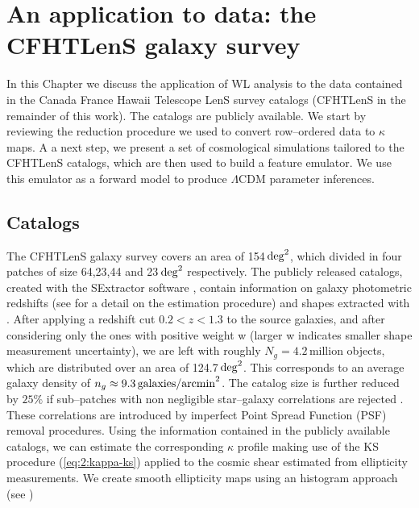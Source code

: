 
\chapter{An application to data: the CFHTLenS galaxy survey}
 \thispagestyle{plain}
\setlength{\parindent}{10mm}

\label{chp:6}

In this Chapter we discuss the application of WL analysis to the data contained in the Canada France Hawaii Telescope LenS survey catalogs \citep{cfht1,cfht2,CFHTKilbinger} (CFHTLenS in the remainder of this work). The catalogs are publicly available. We start by reviewing the reduction procedure we used to convert row--ordered data to $\kappa$ maps. A a next step, we present a set of cosmological simulations tailored to the CFHTLenS catalogs, which are then used to build a feature emulator. We use this emulator as a forward model to produce $\Lambda$CDM parameter inferences.   

\section{Catalogs}
The CFHTLenS galaxy survey covers an area of 154\,${\rm deg}^2$, which divided in four patches of size 64,23,44 and 23\,${\rm deg}^2$ respectively. The publicly released catalogs, created with the SExtractor software \citep{SExtractor}, contain information on galaxy photometric redshifts (see \citep{cfhtPhoto} for a detail on the estimation procedure) and shapes extracted with  \citep{cfht1,cfht2}. After applying a redshift cut $0.2<z<1.3$ to the source galaxies, and after considering only the ones with positive weight w (larger w indicates smaller shape measurement uncertainty), we are left with roughly $N_g=4.2$\,million objects, which are distributed over an area of 124.7\,${\rm deg}^2$. This corresponds to an average galaxy density of $n_g\approx 9.3\,{\rm galaxies/arcmin}^2$. The catalog size is further reduced by $25\%$ if sub--patches with non negligible star--galaxy correlations are rejected \citep{CFHTFu}. These correlations are introduced by imperfect Point Spread Function (PSF) removal procedures. Using the information contained in the publicly available catalogs, we can estimate the corresponding $\kappa$ profile making use of the KS procedure (\ref{eq:2:kappa-ks}) applied to the cosmic shear estimated from ellipticity measurements. We create smooth ellipticity maps using an histogram approach (see \citep{PetriCFHTMink,PetriCFHTPeaks})

